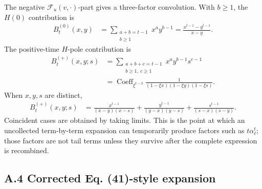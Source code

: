 \documentclass[superscriptaddress, amsmath, amssymb, aps, pre, floatfix]{revtex4-2}
\begin{document}
The negative \(\mathcal F_u(v,\cdot)\)-part gives a three-factor convolution.  With \(b\geq1\), the \(H(0)\) contribution is
\begin{align}
B^{(0)}_t(x,y)
&=\sum_{\substack{a+b=t-1\\ b\geq1}}x^a y^{b-1}
=\frac{x^{t-1}-y^{t-1}}{x-y}.
\label{eq:app_B_zero}
\end{align}
The positive-time \(H\)-pole contribution is
\begin{align}
B^{(+)}_t(x,y;s)
&=\sum_{\substack{a+b+c=t-1\\ b\geq1,\ c\geq1}}x^a y^{b-1}s^{c-1}
\nonumber\\
&=\operatorname{Coeff}_{\xi^{t-3}}
\frac{1}{(1-\xi x)(1-\xi y)(1-\xi s)}.
\label{eq:app_B_plus_def}
\end{align}
When \(x,y,s\) are distinct,
\begin{align}
B^{(+)}_t(x,y;s)
&=
\frac{x^{t-1}}{(x-y)(x-s)}
+\frac{y^{t-1}}{(y-x)(y-s)}
+\frac{s^{t-1}}{(s-x)(s-y)}.
\label{eq:app_B_plus_distinct}
\end{align}
Coincident cases are obtained by taking limits.  This is the point at which an uncollected term-by-term expansion can temporarily produce factors such as \(t\alpha_\ell^t\); those factors are not tail terms unless they survive after the complete expression is recombined.

\subsection*{A.4 Corrected Eq. (41)-style expansion}
\end{document}
